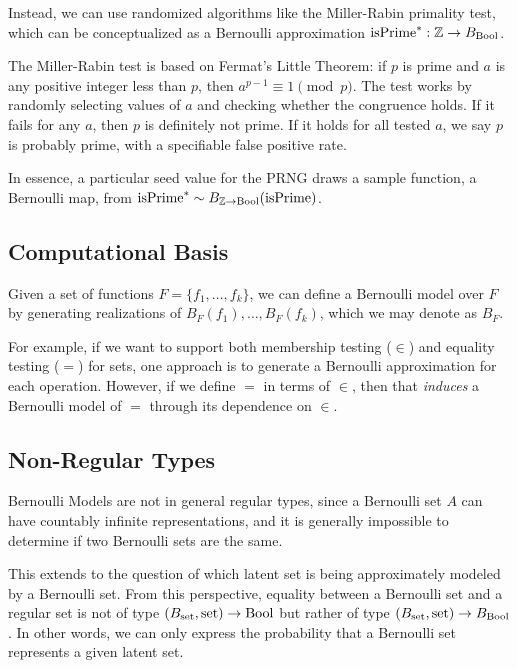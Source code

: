 \documentclass[../main.tex]{subfiles}
\begin{document}
Instead, we can use randomized algorithms like the Miller-Rabin primality test, which can be conceptualized as a Bernoulli approximation $\mathrm{isPrime}^* : \mathbb{Z} \to B_{\mathrm{Bool}}$.

The Miller-Rabin test is based on Fermat's Little Theorem: if $p$ is prime and $a$ is any positive integer less than $p$, then $a^{p-1} \equiv 1 \pmod{p}$. The test works by randomly selecting values of $a$ and checking whether the congruence holds. If it fails for any $a$, then $p$ is definitely not prime. If it holds for all tested $a$, we say $p$ is probably prime, with a specifiable false positive rate.

In essence, a particular seed value for the PRNG draws a sample function, a Bernoulli map, from $\mathrm{isPrime}^* \sim B_{\mathbb{Z} \to \mathrm{Bool}}(\mathrm{isPrime})$.

\subsection{Computational Basis}

Given a set of functions $F = \{f_1, \ldots, f_k\}$, we can define a Bernoulli model over $F$ by generating realizations of $B_{F}(f_1), \ldots, B_{F}(f_k)$, which we may denote as $B_{F}$.

For example, if we want to support both membership testing ($\in$) and equality testing ($=$) for sets, one approach is to generate a Bernoulli approximation for each operation. However, if we define $=$ in terms of $\in$, then that \emph{induces} a Bernoulli model of $=$ through its dependence on $\in$.

\subsection{Non-Regular Types}

Bernoulli Models are not in general regular types, since a Bernoulli set $A$ can have countably infinite representations, and it is generally impossible to determine if two Bernoulli sets are the same.

This extends to the question of which latent set is being approximately modeled by a Bernoulli set. From this perspective, equality between a Bernoulli set and a regular set is not of type $(B_{\mathrm{set}}, \mathrm{set}) \to \mathrm{Bool}$ but rather of type $(B_{\mathrm{set}}, \mathrm{set}) \to B_{\mathrm{Bool}}$. In other words, we can only express the probability that a Bernoulli set represents a given latent set.
\end{document}
